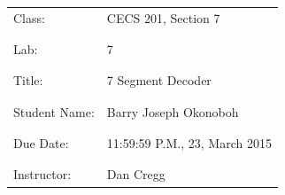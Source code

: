 \documentclass[9pt]{article}
\begin{document}
\vspace*{\fill}
\begin{center}
{\Huge \begin{tabular}{@{}ll@{}}
   Class: & CECS 201, Section 7 \\ \\ \\
   Lab: & 7 \\ \\ \\
   Title: & 7 Segment Decoder \\ \\ \\
   Student Name: & Barry Joseph Okonoboh \\ \\ \\
   Due Date: & 11:59:59 P.M., 23, March 2015 \\ \\ \\
   Instructor: & Dan Cregg
\end{tabular}}
\end{center}
\vspace*{\fill}
\newpage
\end{document}
